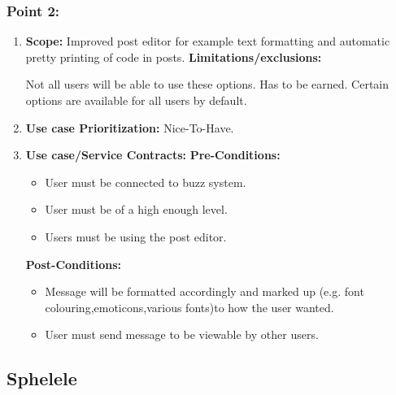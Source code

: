 \documentclass[11pt]{article}
\begin{document}
\subsubsection{Point 2:} 
\begin{enumerate}
\item 
\textbf{Scope:}
Improved post editor for example text formatting and automatic pretty printing of code in posts.
\newline
\textbf{Limitations/exclusions:} 

Not all users will be able to use these options. Has to be earned. Certain options are available for all users by default.

\item 
\textbf{Use case Prioritization:} Nice-To-Have.

\item 
\textbf{Use case/Service Contracts:} 
\newline
\textbf{Pre-Conditions: }
\begin{itemize}
\item User must be connected to buzz system.
\item User must be of a high enough level.
\item Users must be using the post editor.
\end{itemize}
 

\textbf{Post-Conditions: }
\begin{itemize}

\item Message will be formatted accordingly and marked up (e.g. font colouring,emoticons,various fonts)to how the user wanted. 
\item User must send message to be viewable by other users.
\end{itemize}
\end{enumerate}

\subsection{Sphelele}
\end{document}
